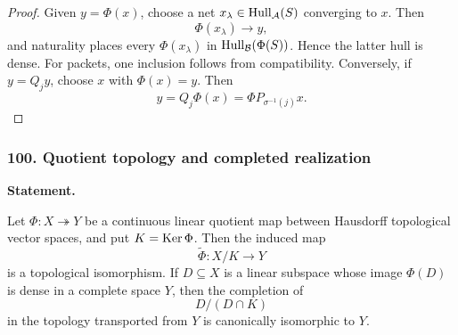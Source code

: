 \begin{proof}
Given $y=\Phi(x)$, choose a net $x_\lambda\in\operatorname{Hull}_{\mathcal A}(S)$ converging to $x$.  Then
\[
\Phi(x_\lambda)\to y,
\]
and naturality places every $\Phi(x_\lambda)$ in $\operatorname{Hull}_{\mathcal B}(\Phi(S))$.  Hence the latter hull is dense.  For packets, one inclusion follows from compatibility.  Conversely, if $y=Q_jy$, choose $x$ with $\Phi(x)=y$.  Then
\[
y=Q_j\Phi(x)=\Phi P_{\sigma^{-1}(j)}x.
\]
\end{proof}
\subsubsection*{100. Quotient topology and completed realization}
\label{rec:PSC-I-T-QUOTIENT-TOPOLOGY-COMPLETION}
\textbf{Statement.}\par
Let $\Phi:X\twoheadrightarrow Y$ be a continuous linear quotient map between Hausdorff topological vector spaces, and put $K=\operatorname{Ker}\Phi$.  Then the induced map
\[
\widetilde\Phi:X/K\longrightarrow Y
\]
is a topological isomorphism.  If $D\subseteq X$ is a linear subspace whose image $\Phi(D)$ is dense in a complete space $Y$, then the completion of
\[
D/(D\cap K)
\]
in the topology transported from $Y$ is canonically isomorphic to $Y$.

